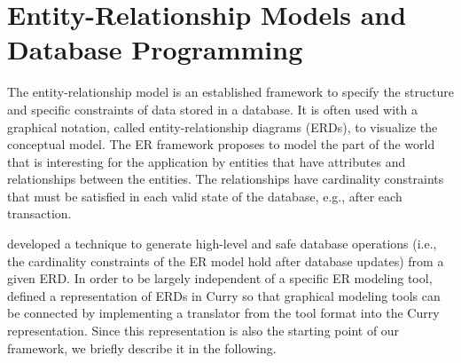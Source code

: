 \documentclass{tlp}
\begin{document}
\section{Entity-Relationship Models and Database Programming}
\label{sec:er}

The entity-relationship model \cite{Chen76} is an established framework
to specify the structure and specific constraints of data stored
in a database. It is often used with
a graphical notation, called entity-relationship diagrams (ERDs),
to visualize the conceptual model.
The ER framework proposes to model the part of the world that is
interesting for the application by entities that have attributes
and relationships between the entities.
The relationships have cardinality constraints
that must be satisfied in each valid state of the database, e.g.,
after each transaction.

developed a technique to generate high-level and safe database
operations (i.e., the cardinality constraints of the ER model
hold after database updates) from a given ERD.
In order to be largely independent of a specific ER modeling tool,
 defined a representation of ERDs
in Curry so that graphical modeling tools can be connected
by implementing a translator from the tool format into
the Curry representation.
Since this representation is also the starting point of our framework,
we briefly describe it in the following.
\end{document}
